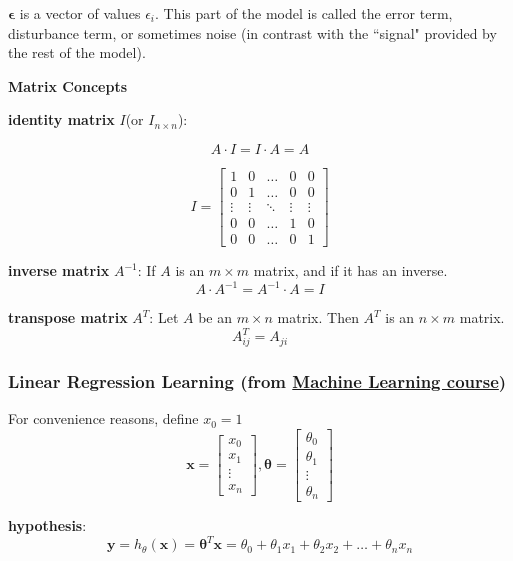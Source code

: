 \documentclass{article}
\begin{document}
\bigskip

\noindent \(\boldsymbol{\epsilon}\) is a vector of values \(\epsilon_{i}\). This part of the model is called the error term, disturbance term, or sometimes noise (in contrast with the ``signal" provided by the rest of the model).

\bigskip

\noindent \textbf{Matrix Concepts}

\bigskip

\noindent \textbf{identity matrix} \(I\)(or \(I_{n \times n}\)):

\[A \cdot I = I \cdot A = A\]

\[
I = 
\begin{bmatrix}
1 & 0 & \dots & 0 & 0\\
0 & 1 & \dots & 0 & 0\\
\vdots & \vdots & \ddots & \vdots & \vdots\\
0 & 0 & \dots & 1 & 0\\
0 & 0 & \dots & 0 & 1
\end{bmatrix}
\]

\noindent \textbf{inverse matrix} \(A^{-1}\): If \(A\) is an \(m \times m\) matrix, and if it has an inverse.
\[A \cdot A^{-1} = A^{-1} \cdot A = I\]

\noindent \textbf{transpose matrix} \(A^{T}\): Let \(A\) be an \(m \times n\) matrix. Then \(A^T\) is an \(n \times m\) matrix.
\[A^T_{ij} = A_{ji}\]

\subsubsection{Linear Regression Learning (from \href{https://www.coursera.org/learn/machine-learning}{Machine Learning course})}

\noindent For convenience reasons, define \(x_0 = 1\)
\[
\textbf{x} = 
\begin{bmatrix}
x_0\\
x_1\\
\vdots\\
x_n
\end{bmatrix}
,
\boldsymbol{\theta} = 
\begin{bmatrix}
\theta_0\\
\theta_1\\
\vdots\\
\theta_n
\end{bmatrix}
\]

\noindent \textbf{hypothesis}:
\[\textbf{y} = h_{\theta}(\textbf{x}) = \boldsymbol{\theta}^T \textbf{x} = \theta_0 + \theta_1 x_1 + \theta_2 x_2 + \dots + \theta_n x_n\]
\end{document}
